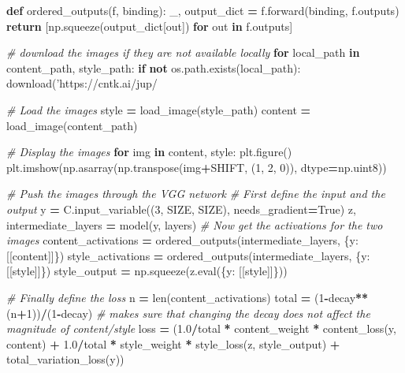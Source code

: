 \documentclass[]{book}
\newenvironment{Shaded}{\begin{snugshade}}{\end{snugshade}}
\newcommand{\KeywordTok}[1]{\textcolor[rgb]{0.13,0.29,0.53}{\textbf{#1}}}
\newcommand{\DecValTok}[1]{\textcolor[rgb]{0.00,0.00,0.81}{#1}}
\newcommand{\FloatTok}[1]{\textcolor[rgb]{0.00,0.00,0.81}{#1}}
\newcommand{\SpecialCharTok}[1]{\textcolor[rgb]{0.00,0.00,0.00}{#1}}
\newcommand{\StringTok}[1]{\textcolor[rgb]{0.31,0.60,0.02}{#1}}
\newcommand{\CommentTok}[1]{\textcolor[rgb]{0.56,0.35,0.01}{\textit{#1}}}
\newcommand{\VariableTok}[1]{\textcolor[rgb]{0.00,0.00,0.00}{#1}}
\newcommand{\ControlFlowTok}[1]{\textcolor[rgb]{0.13,0.29,0.53}{\textbf{#1}}}
\newcommand{\OperatorTok}[1]{\textcolor[rgb]{0.81,0.36,0.00}{\textbf{#1}}}
\newcommand{\BuiltInTok}[1]{#1}
\newcommand{\NormalTok}[1]{#1}
\theoremstyle{definition}
\theoremstyle{definition}
\theoremstyle{definition}
\theoremstyle{remark}
\begin{document}
\begin{Shaded}
\begin{Highlighting}[]
\KeywordTok{def}\NormalTok{ ordered_outputs(f, binding):}
\NormalTok{    _, output_dict }\OperatorTok{=}\NormalTok{ f.forward(binding, f.outputs)}
    \ControlFlowTok{return}\NormalTok{ [np.squeeze(output_dict[out]) }\ControlFlowTok{for}\NormalTok{ out }\KeywordTok{in}\NormalTok{ f.outputs]}

\CommentTok{# download the images if they are not available locally}
\ControlFlowTok{for}\NormalTok{ local_path }\KeywordTok{in}\NormalTok{ content_path, style_path:}
    \ControlFlowTok{if} \KeywordTok{not}\NormalTok{ os.path.exists(local_path):}
\NormalTok{        download(}\StringTok{'https://cntk.ai/jup/}\SpecialCharTok{%

\CommentTok{# Load the images}
\NormalTok{style   }\OperatorTok{=}\NormalTok{ load_image(style_path)}
\NormalTok{content }\OperatorTok{=}\NormalTok{ load_image(content_path)}

\CommentTok{# Display the images}
\ControlFlowTok{for}\NormalTok{ img }\KeywordTok{in}\NormalTok{ content, style:}
\NormalTok{    plt.figure()}
\NormalTok{    plt.imshow(np.asarray(np.transpose(img}\OperatorTok{+}\NormalTok{SHIFT, (}\DecValTok{1}\NormalTok{, }\DecValTok{2}\NormalTok{, }\DecValTok{0}\NormalTok{)), dtype}\OperatorTok{=}\NormalTok{np.uint8))}

\CommentTok{# Push the images through the VGG network }
\CommentTok{# First define the input and the output}
\NormalTok{y }\OperatorTok{=}\NormalTok{ C.input_variable((}\DecValTok{3}\NormalTok{, SIZE, SIZE), needs_gradient}\OperatorTok{=}\VariableTok{True}\NormalTok{)}
\NormalTok{z, intermediate_layers }\OperatorTok{=}\NormalTok{ model(y, layers)}
\CommentTok{# Now get the activations for the two images}
\NormalTok{content_activations }\OperatorTok{=}\NormalTok{ ordered_outputs(intermediate_layers, \{y: [[content]]\})}
\NormalTok{style_activations }\OperatorTok{=}\NormalTok{ ordered_outputs(intermediate_layers, \{y: [[style]]\})}
\NormalTok{style_output }\OperatorTok{=}\NormalTok{ np.squeeze(z.}\BuiltInTok{eval}\NormalTok{(\{y: [[style]]\}))}

\CommentTok{# Finally define the loss}
\NormalTok{n }\OperatorTok{=} \BuiltInTok{len}\NormalTok{(content_activations)}
\NormalTok{total }\OperatorTok{=}\NormalTok{ (}\DecValTok{1}\OperatorTok{-}\NormalTok{decay}\OperatorTok{**}\NormalTok{(n}\OperatorTok{+}\DecValTok{1}\NormalTok{))}\OperatorTok{/}\NormalTok{(}\DecValTok{1}\OperatorTok{-}\NormalTok{decay) }\CommentTok{# makes sure that changing the decay does not affect the magnitude of content/style}
\NormalTok{loss }\OperatorTok{=}\NormalTok{ (}\FloatTok{1.0}\OperatorTok{/}\NormalTok{total }\OperatorTok{*}\NormalTok{ content_weight }\OperatorTok{*}\NormalTok{ content_loss(y, content) }
         \OperatorTok{+} \FloatTok{1.0}\OperatorTok{/}\NormalTok{total }\OperatorTok{*}\NormalTok{ style_weight }\OperatorTok{*}\NormalTok{ style_loss(z, style_output) }
         \OperatorTok{+}\NormalTok{ total_variation_loss(y))}

}
\end{Highlighting}
\end{Shaded}
\end{document}
